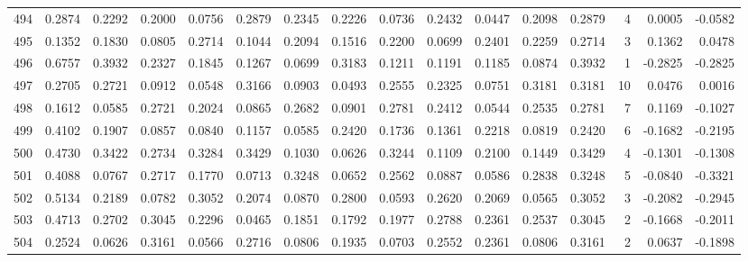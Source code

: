 \begin{tabular}{lrrrrrrrrrrrrrrr}
494 &      0.2874 &  0.2292 &  0.2000 &  0.0756 &  0.2879 &  0.2345 &  0.2226 &  0.0736 &  0.2432 &  0.0447 &   0.2098 &     0.2879 &      4 &                    0.0005 &                    -0.0582 \\
495 &      0.1352 &  0.1830 &  0.0805 &  0.2714 &  0.1044 &  0.2094 &  0.1516 &  0.2200 &  0.0699 &  0.2401 &   0.2259 &     0.2714 &      3 &                    0.1362 &                     0.0478 \\
496 &      0.6757 &  0.3932 &  0.2327 &  0.1845 &  0.1267 &  0.0699 &  0.3183 &  0.1211 &  0.1191 &  0.1185 &   0.0874 &     0.3932 &      1 &                   -0.2825 &                    -0.2825 \\
497 &      0.2705 &  0.2721 &  0.0912 &  0.0548 &  0.3166 &  0.0903 &  0.0493 &  0.2555 &  0.2325 &  0.0751 &   0.3181 &     0.3181 &     10 &                    0.0476 &                     0.0016 \\
498 &      0.1612 &  0.0585 &  0.2721 &  0.2024 &  0.0865 &  0.2682 &  0.0901 &  0.2781 &  0.2412 &  0.0544 &   0.2535 &     0.2781 &      7 &                    0.1169 &                    -0.1027 \\
499 &      0.4102 &  0.1907 &  0.0857 &  0.0840 &  0.1157 &  0.0585 &  0.2420 &  0.1736 &  0.1361 &  0.2218 &   0.0819 &     0.2420 &      6 &                   -0.1682 &                    -0.2195 \\
500 &      0.4730 &  0.3422 &  0.2734 &  0.3284 &  0.3429 &  0.1030 &  0.0626 &  0.3244 &  0.1109 &  0.2100 &   0.1449 &     0.3429 &      4 &                   -0.1301 &                    -0.1308 \\
501 &      0.4088 &  0.0767 &  0.2717 &  0.1770 &  0.0713 &  0.3248 &  0.0652 &  0.2562 &  0.0887 &  0.0586 &   0.2838 &     0.3248 &      5 &                   -0.0840 &                    -0.3321 \\
502 &      0.5134 &  0.2189 &  0.0782 &  0.3052 &  0.2074 &  0.0870 &  0.2800 &  0.0593 &  0.2620 &  0.2069 &   0.0565 &     0.3052 &      3 &                   -0.2082 &                    -0.2945 \\
503 &      0.4713 &  0.2702 &  0.3045 &  0.2296 &  0.0465 &  0.1851 &  0.1792 &  0.1977 &  0.2788 &  0.2361 &   0.2537 &     0.3045 &      2 &                   -0.1668 &                    -0.2011 \\
504 &      0.2524 &  0.0626 &  0.3161 &  0.0566 &  0.2716 &  0.0806 &  0.1935 &  0.0703 &  0.2552 &  0.2361 &   0.0806 &     0.3161 &      2 &                    0.0637 &                    -0.1898 \\

\end{tabular}
